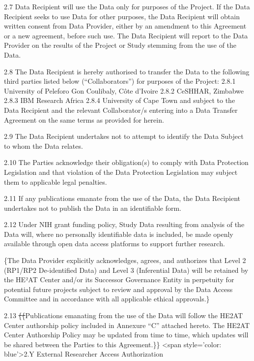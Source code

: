 \documentclass[12pt,letterpaper]{article}
\newcommand{\deleted}[1]{\textcolor{deletecolor}{\sout{#1}}}
\newcommand{\added}[1]{\textcolor{addcolor}{#1}}
\begin{document}
2.7	Data Recipient will use the Data only for purposes of the Project.  If the Data Recipient seeks to use Data for other purposes, the Data Recipient will obtain written consent from Data Provider, either by an amendment to this Agreement or a new agreement, before such use. The Data Recipient will report to the Data Provider on the results of the Project or Study stemming from the use of the Data. 

2.8	The Data Recipient is hereby authorised to transfer the Data to the following third parties listed below (“Collaborators”) for purposes of the Project:     2.8.1	University of Peleforo Gon Coulibaly, Côte d'Ivoire     2.8.2	CeSHHAR, Zimbabwe     2.8.3	IBM Research Africa      2.8.4	University of Cape Town     and subject to the Data Recipient and the relevant Collaborator/s entering into a Data Transfer Agreement on the same terms as provided for herein.  

2.9	The Data Recipient undertakes not to attempt to identify the Data Subject to whom the Data relates.

2.10	The Parties acknowledge their obligation(s) to comply with Data Protection Legislation and that violation of the Data Protection Legislation may subject them to applicable legal penalties.

2.11	If any publications emanate from the use of the Data, the Data Recipient undertakes not to publish the Data in an identifiable form. 

2.12	Under NIH grant funding policy, Study Data resulting from analysis of the Data will, where no personally identifiable data is included, be made openly available through open data access platforms to support further research.

\added\{The Data Provider explicitly acknowledges, agrees, and authorizes that Level 2 (RP1/RP2 De-identified Data) and Level 3 (Inferential Data) will be retained by the HE²AT Center and/or its Successor Governance Entity in perpetuity for potential future projects subject to review and approval by the Data Access Committee and in accordance with all applicable ethical approvals.\}

2.13	\deleted\{\deleted\{Publications emanating from the use of the Data will follow the HE2AT Center authorship policy included in Annexure “C” attached hereto. The HE2AT Center Authorship Policy may be updated from time to time, which updates will be shared between the Parties to this Agreement.\}\} <span style='color: blue'>2.Y External Researcher Access Authorization
\end{document}
